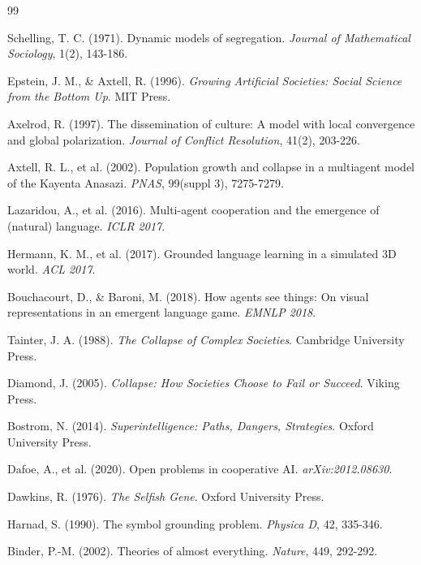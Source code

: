 \documentclass[11pt,a4paper]{article}
\begin{document}

\begin{thebibliography}{99}

Schelling, T. C. (1971). Dynamic models of segregation. \textit{Journal of Mathematical Sociology}, 1(2), 143-186.

Epstein, J. M., \& Axtell, R. (1996). \textit{Growing Artificial Societies: Social Science from the Bottom Up}. MIT Press.

Axelrod, R. (1997). The dissemination of culture: A model with local convergence and global polarization. \textit{Journal of Conflict Resolution}, 41(2), 203-226.

Axtell, R. L., et al. (2002). Population growth and collapse in a multiagent model of the Kayenta Anasazi. \textit{PNAS}, 99(suppl 3), 7275-7279.

Lazaridou, A., et al. (2016). Multi-agent cooperation and the emergence of (natural) language. \textit{ICLR 2017}.

Hermann, K. M., et al. (2017). Grounded language learning in a simulated 3D world. \textit{ACL 2017}.

Bouchacourt, D., \& Baroni, M. (2018). How agents see things: On visual representations in an emergent language game. \textit{EMNLP 2018}.

Tainter, J. A. (1988). \textit{The Collapse of Complex Societies}. Cambridge University Press.

Diamond, J. (2005). \textit{Collapse: How Societies Choose to Fail or Succeed}. Viking Press.

Bostrom, N. (2014). \textit{Superintelligence: Paths, Dangers, Strategies}. Oxford University Press.

Dafoe, A., et al. (2020). Open problems in cooperative AI. \textit{arXiv:2012.08630}.

Dawkins, R. (1976). \textit{The Selfish Gene}. Oxford University Press.

Harnad, S. (1990). The symbol grounding problem. \textit{Physica D}, 42, 335-346.

Binder, P.-M. (2002). Theories of almost everything. \textit{Nature}, 449, 292-292.

\end{thebibliography}
\end{document}
